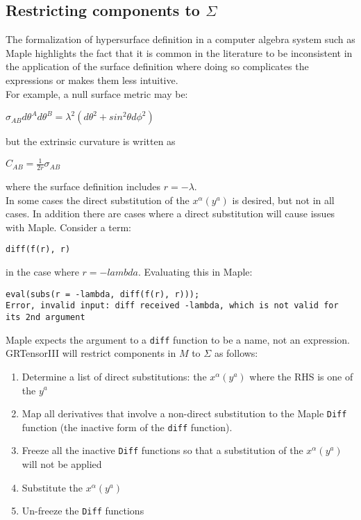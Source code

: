 \documentclass{article}
\begin{document}
\subsection{Restricting components to $\Sigma$}
The formalization of hypersurface definition in a computer algebra system such as Maple highlights the
fact that it is common in the literature to be inconsistent in the application of the surface definition where
doing so complicates the expressions or makes them less intuitive. \\

For example, a null surface metric may be:
\begin{center}
$\sigma_{AB} d\theta^A d\theta^B = \lambda^2 \left(d\theta^2 + sin^2 \theta d\phi^2 \right)$
\end{center}
but the extrinsic curvature is written as 
\begin{center}
$C_{AB} = \frac{1}{2r} \sigma_{AB}$
\end{center}
where the surface definition includes $r=-\lambda$. \\

In some cases the direct substitution of the $x^\alpha(y^a)$ is desired, but not in all cases. In addition there are cases where
a direct substitution will cause issues with Maple. Consider a term:
\begin{center}
\texttt{diff(f(r), r)}
\end{center}
in the case where $r=-lambda$. Evaluating this in Maple:
\begin{center}
\begin{verbatim}
eval(subs(r = -lambda, diff(f(r), r)));
Error, invalid input: diff received -lambda, which is not valid for its 2nd argument
\end{verbatim}
\end{center}
Maple expects the argument to a \texttt{diff} function to be a name, not an expression. \\

GRTensorIII will restrict components in $M$ to $\Sigma$ as follows:
\begin{enumerate}
\item Determine a list of direct substitutions: the $x^\alpha(y^a)$ where the RHS is one of the $y^a$
\item Map all derivatives that involve a non-direct substitution to the Maple \texttt{Diff} function (the
inactive form of the \texttt{diff} function). 
\item Freeze all the inactive \texttt{Diff} functions so that a substitution of the $x^\alpha(y^a)$ will not 
be applied
\item Substitute the $x^\alpha(y^a)$
\item Un-freeze the \texttt{Diff} functions
\end{enumerate}
\end{document}
